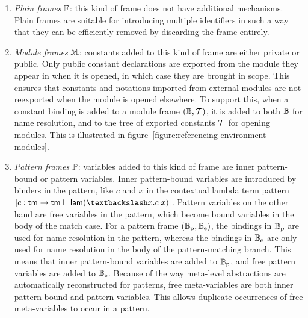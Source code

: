 \begin{enumerate}
\item
\textit{Plain frames} $\mathbb{F}$: this kind of frame does not have additional mechanisms.
Plain frames are suitable for introducing multiple identifiers in such a way that they can be efficiently removed by discarding the frame entirely.
\item
\textit{Module frames} $\mathbb{M}$: constants added to this kind of frame are either private or public.
Only public constant declarations are exported from the module they appear in when it is opened, in which case they are brought in scope.
This ensures that constants and notations imported from external modules are not reexported when the module is opened elsewhere.
To support this, when a constant binding is added to a module frame $(\mathbb{B}, \mathcal{T})$, it is added to both $\mathbb{B}$ for name resolution, and to the tree of exported constants $\mathcal{T}$ for opening modules.
This is illustrated in figure~\ref{figure:referencing-environment-modules}.
\item
\textit{Pattern frames} $\mathbb{P}$: variables added to this kind of frame are inner pattern-bound or pattern variables.
Inner pattern-bound variables are introduced by binders in the pattern, like $c$ and $x$ in the contextual lambda term pattern $[c : \mathsf{tm} \rightarrow \mathsf{tm} \vdash \mathsf{lam} (\textbackslash x. c\; x)]$.
Pattern variables on the other hand are free variables in the pattern, which become bound variables in the body of the match case.
For a pattern frame $(\mathbb{B}_{\text{p}}, \mathbb{B}_{\text{e}})$, the bindings in $\mathbb{B}_{\text{p}}$ are used for name resolution in the pattern, whereas the bindings in $\mathbb{B}_{\text{e}}$ are only used for name resolution in the body of the pattern-matching branch.
This means that inner pattern-bound variables are added to $\mathbb{B}_{\text{p}}$, and free pattern variables are added to $\mathbb{B}_{\text{e}}$.
Because of the way meta-level abstractions are automatically reconstructed for patterns, free meta-variables are both inner pattern-bound and pattern variables.
This allows duplicate occurrences of free meta-variables to occur in a pattern.
\end{enumerate}

